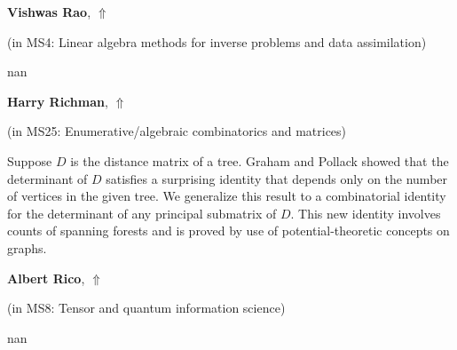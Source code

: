 \documentclass[ILAS2025-program.tex]{subfiles}
\begin{document}
     \hypertarget{down0356}{}\begin{ilasabstract}
    
    \textbf{Vishwas Rao},  \hfill \hyperlink{up0356}{$\Uparrow$}
    
    (in {\color{mstitle}MS4: Linear algebra methods for inverse problems and data assimilation})
        
        \mtskip
    nan\end{ilasabstract}
     \hypertarget{down0182}{}\begin{ilasabstract}
    
    \textbf{Harry Richman},  \hfill \hyperlink{up0182}{$\Uparrow$}
    
    (in {\color{mstitle}MS25: Enumerative/algebraic combinatorics and matrices})
        
        \mtskip
    Suppose $D$ is the distance matrix of a tree. 
Graham and Pollack showed that the determinant of $D$ satisfies a surprising identity that depends only on the number of vertices in the given tree.
We generalize this result to a combinatorial identity for the determinant of any principal submatrix of $D$.
This new identity involves counts of spanning forests and is proved by use of potential-theoretic concepts on graphs.
\end{ilasabstract}
     \hypertarget{down0284}{}\begin{ilasabstract}
    
    \textbf{Albert Rico},  \hfill \hyperlink{up0284}{$\Uparrow$}
    
    (in {\color{mstitle}MS8: Tensor and quantum information science})
        
        \mtskip
    nan\end{ilasabstract}
\end{document}
